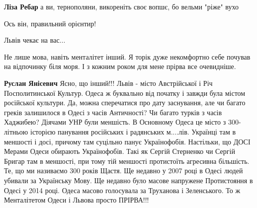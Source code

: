 \begin{itemize}
\begin{itemize}
\textbf{Ліза Ребар} а ви, тернополяни, викореніть своє вопшє, бо вельми "ріже" вухо
\end{itemize}

 
Ось він, правильний орієнтир!

 
Львів чекає на вас...👋

 

Не лише мова, навіть менталітет інший. Я торік дуже некомфортно себе почував на
відпочинку біля моря. І з кожним роком для мене прірва все очевидніше.

\begin{itemize}
 
\textbf{Руслан Янісевич} Ясно, що інший!!! Львів - місто Австрійської і Річ Посполитинської Культур. Одеса ж буквально від початку і завжди була містом російської культури. Да, можна сперечатися про дату заснування, але чи багато греків залишилося в Одесі з часів Античності? Чи багато турків з часів Хаджибею? Діячами УНР були меншість. В Основному Одеса це місто з 300-літньою історією панування російських і радянських м....лів. Українці там в меншості і досі, причому там суцільно панує Українофобія. Настільки, що ДОСІ Мерами Одеси обирають Українофобів. Такі як Сергій Стерненко чи Сергій Бригар там в меншості, при тому тій меншості протистоїть агресивна більшість. Те, що ми називаємо 300 років Щастя. Ще недавно у 2007 році в Одесі людей убивали за Українську Мову. Ще недавно було масове напружене Протистояння в Одесі у 2014 році. Одеса масово голосувала за Труханова і Зеленського. То ж Менталітетом Одеси і Львова просто ПРІРВА!!!


\end{itemize}
\end{itemize}
